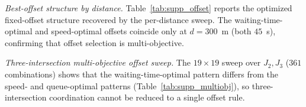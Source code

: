 \documentclass[12pt]{article}
\begin{document}
\textit{Best-offset structure by distance.} Table~\ref{tab:supp_offset} reports the
optimized fixed-offset structure recovered by the per-distance sweep. The
waiting-time-optimal and speed-optimal offsets coincide only at $d=300$~m (both $45$~s),
confirming that offset selection is multi-objective.

\begin{table}[H]
\centering
\caption{Best-offset structure by distance for the generated
70\%--15\%--15\% turning-movement spatial-horizon variants. WT, speed,
and queue columns give the offset (s) that optimizes each objective and
the corresponding value. All cases are capacity-unconstrained.}
\label{tab:supp_offset}
\small
\setlength{\tabcolsep}{4pt}
\end{table}

\textit{Three-intersection multi-objective offset sweep.} The $19\times19$ sweep over
$J_2,J_3$ ($361$ combinations) shows that the waiting-time-optimal pattern differs from
the speed- and queue-optimal patterns (Table~\ref{tab:supp_multiobj}), so
three-intersection coordination cannot be reduced to a single offset rule.
\end{document}
